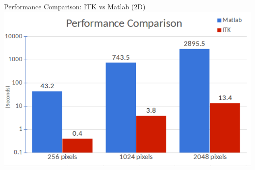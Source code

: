 \documentclass[10pt,aspectratio=169]{beamer}
\begin{document}
{
\begin{frame}[fragile]{Performance Comparison: ITK vs Matlab (2D)}
  \centering
  \includegraphics[height=0.9\textheight]{./figures/TextureFeaturesPerformanceComparison.png}
\end{frame}

}
\end{document}
